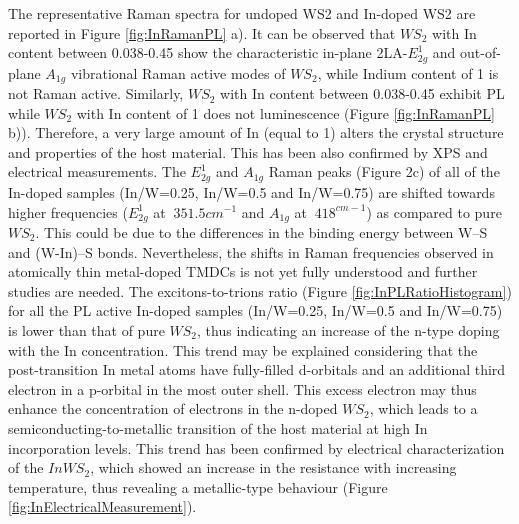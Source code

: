 The representative Raman spectra for undoped WS2 and In-doped WS2 are reported in Figure \ref{fig:InRamanPL} a). It can be observed that $WS_2$ with In content between 0.038-0.45 show the characteristic in-plane 2LA-$E^1_{2g}$ and out-of-plane $A_{1g}$ vibrational Raman active modes of $WS_2$, while Indium content of 1 is not Raman active. Similarly, $WS_2$ with In content between 0.038-0.45 exhibit PL while $WS_2$ with In content of 1 does not luminescence (Figure \ref{fig:InRamanPL} b)). Therefore, a very large amount of In (equal to 1) alters the crystal structure and properties of the host material. This has been also confirmed by XPS and electrical measurements. The $E^1_{2g}$ and $A_{1g}$ Raman peaks (Figure 2c) of all of the In-doped samples (In/W=0.25, In/W=0.5 and In/W=0.75) are shifted towards higher frequencies ($E^1_{2g}$ at $~351.5cm^{-1}$ and $A_{1g}$ at $~418^{cm-1}$) as compared to pure $WS_2$. This could be due to the differences in the binding energy between W–S and (W-In)–S bonds. Nevertheless, the shifts in Raman frequencies observed in atomically thin metal-doped TMDCs is not yet fully understood and further studies are needed. The excitons-to-trions ratio (Figure \ref{fig:InPLRatioHistogram}) for all the PL active In-doped samples (In/W=0.25, In/W=0.5 and In/W=0.75) is lower than that of pure $WS_2$, thus indicating an increase of the n-type doping with the In concentration. This trend may be explained considering that the post-transition In metal atoms have fully-filled d-orbitals and an additional third electron in a p-orbital in the most outer shell. This excess electron may thus enhance the concentration of electrons in the n-doped $WS_2$, which leads to a semiconducting-to-metallic transition of the host material at high In incorporation levels. This trend has been confirmed by electrical characterization of the $InWS_2$, which showed an increase in the resistance with increasing temperature, thus revealing a metallic-type behaviour (Figure \ref{fig:InElectricalMeasurement}).

